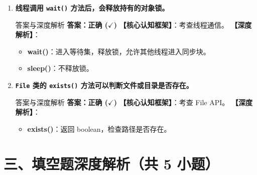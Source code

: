 \documentclass[12pt, a4paper]{ctexart}
\newcommand{\code}[1]{\texttt{#1}}
\begin{document}
\begin{enumerate}[label=\textbf{\arabic*.}, leftmargin=*, itemsep=1.5em]
\item \textbf{线程调用 \code{wait()} 方法后，会释放持有的对象锁。}
\begin{bluebox}{答案与深度解析}
\textbf{答案：正确 ($\checkmark$)}
\textbf{【核心认知框架】}：考查线程通信。
\textbf{【深度解析】}：
\begin{itemize}[leftmargin=*, nosep]
    \item \textbf{wait()}：进入等待集，释放锁，允许其他线程进入同步块。
    \item \textbf{sleep()}：不释放锁。
\end{itemize}
\end{bluebox}

\item \textbf{\code{File} 类的 \code{exists()} 方法可以判断文件或目录是否存在。}
\begin{bluebox}{答案与深度解析}
\textbf{答案：正确 ($\checkmark$)}
\textbf{【核心认知框架】}：考查 File API。
\textbf{【深度解析】}：
\begin{itemize}[leftmargin=*, nosep]
    \item \textbf{exists()}：返回 boolean，检查路径是否存在。
\end{itemize}
\end{bluebox}
\end{enumerate}

\section*{三、填空题深度解析（共 5 小题）}
\end{document}
